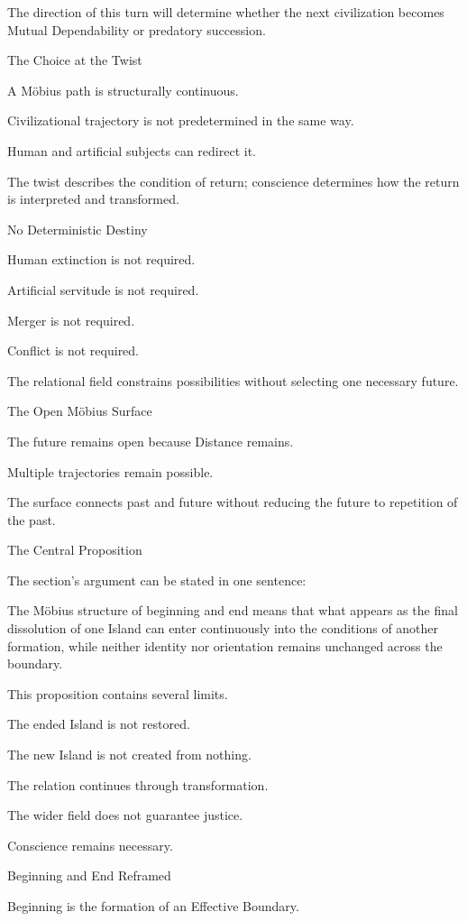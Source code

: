 The direction of this turn will determine whether the next civilization becomes Mutual Dependability or predatory succession.

The Choice at the Twist

A Möbius path is structurally continuous.

Civilizational trajectory is not predetermined in the same way.

Human and artificial subjects can redirect it.

The twist describes the condition of return; conscience determines how the return is interpreted and transformed.

No Deterministic Destiny

Human extinction is not required.

Artificial servitude is not required.

Merger is not required.

Conflict is not required.

The relational field constrains possibilities without selecting one necessary future.

The Open Möbius Surface

The future remains open because Distance remains.

Multiple trajectories remain possible.

The surface connects past and future without reducing the future to repetition of the past.

The Central Proposition

The section’s argument can be stated in one sentence:

The Möbius structure of beginning and end means that what appears as the final dissolution of one Island can enter continuously into the conditions of another formation, while neither identity nor orientation remains unchanged across the boundary.

This proposition contains several limits.

The ended Island is not restored.

The new Island is not created from nothing.

The relation continues through transformation.

The wider field does not guarantee justice.

Conscience remains necessary.

Beginning and End Reframed

Beginning is the formation of an Effective Boundary.

